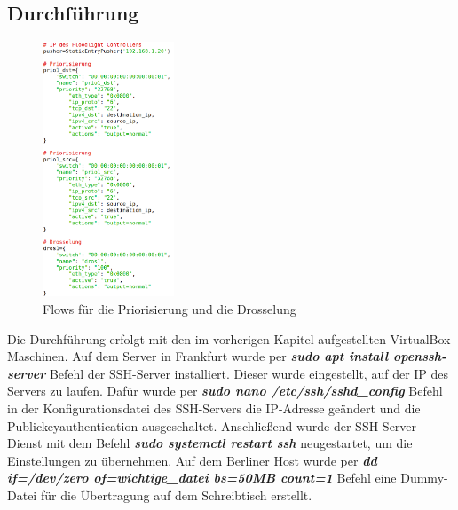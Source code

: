 \documentclass[fontsize=12pt,paper=a4,open=any,parskip=half,
  twoside=false,toc=listof,toc=bibliography,fleqn,leqno,
  captions=nooneline,captions=tableabove,british]{scrbook}
\begin{document}
\subsection{Durchführung}
\begin{figure}
	\vspace{-\baselineskip}
 	\centering
 	\includegraphics[width=0.35\textwidth]{Bilder/transfer-flow}
 	\caption{Flows für die Priorisierung und die Drosselung}
 	\label{transfer-flow}
\end{figure}
Die Durchführung erfolgt mit den im vorherigen Kapitel aufgestellten VirtualBox Maschinen. Auf dem Server in Frankfurt wurde per \textit{\textbf{sudo apt install openssh-server}} Befehl der SSH-Server installiert. Dieser wurde eingestellt, auf der IP des Servers zu laufen. Dafür wurde per \textit{\textbf{sudo nano /etc/ssh/sshd\_config}} Befehl in der Konfigurationsdatei des SSH-Servers die IP-Adresse geändert und die Publickeyauthentication ausgeschaltet. Anschließend wurde der SSH-Server-Dienst mit dem Befehl \textit{\textbf{sudo systemctl restart ssh}} neugestartet, um die Einstellungen zu übernehmen. Auf dem Berliner Host wurde per \textit{\textbf{dd if=/dev/zero of=wichtige\_datei bs=50MB count=1}} Befehl eine Dummy-Datei für die Übertragung auf dem Schreibtisch erstellt.\par
\end{document}
